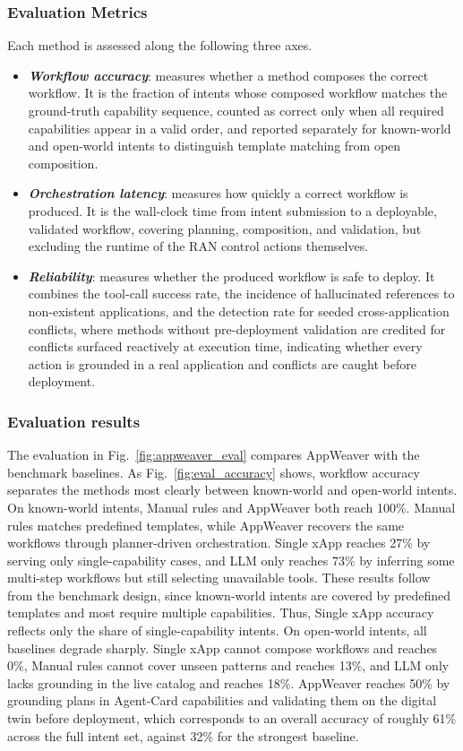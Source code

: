 \documentclass[conference]{IEEEtran}
\begin{document}
\subsubsection{Evaluation Metrics}
Each method is assessed along the following three axes.
\begin{itemize}[leftmargin=1.2em, itemsep=2pt, topsep=2pt]
  \item \textbf{\textit{Workflow accuracy}}: measures whether a method composes the correct workflow. It is the fraction of intents whose composed workflow matches the ground-truth capability sequence, counted as correct only when all required capabilities appear in a valid order, and reported separately for known-world and open-world intents to distinguish template matching from open composition.
  \item \textbf{\textit{Orchestration latency}}: measures how quickly a correct workflow is produced. It is the wall-clock time from intent submission to a deployable, validated workflow, covering planning, composition, and validation, but excluding the runtime of the RAN control actions themselves.
  \item \textbf{\textit{Reliability}}: measures whether the produced workflow is safe to deploy. It combines the tool-call success rate, the incidence of hallucinated references to non-existent applications, and the detection rate for seeded cross-application conflicts, where methods without pre-deployment validation are credited for conflicts surfaced reactively at execution time, indicating whether every action is grounded in a real application and conflicts are caught before deployment.
\end{itemize}

\subsubsection{Evaluation results} 
The evaluation in Fig.~\ref{fig:appweaver_eval} compares AppWeaver with the benchmark baselines.
As Fig.~\ref{fig:eval_accuracy} shows, workflow accuracy separates the methods most clearly between known-world and open-world intents. On known-world intents, Manual rules and AppWeaver both reach 100\%. Manual rules matches predefined templates, while AppWeaver recovers the same workflows through planner-driven orchestration. Single xApp reaches 27\% by serving only single-capability cases, and LLM only reaches 73\% by inferring some multi-step workflows but still selecting unavailable tools. These results follow from the benchmark design, since known-world intents are covered by predefined templates and most require multiple capabilities. Thus, Single xApp accuracy reflects only the share of single-capability intents. On open-world intents, all baselines degrade sharply. Single xApp cannot compose workflows and reaches 0\%, Manual rules cannot cover unseen patterns and reaches 13\%, and LLM only lacks grounding in the live catalog and reaches 18\%. AppWeaver reaches 50\% by grounding plans in Agent-Card capabilities and validating them on the digital twin before deployment, which corresponds to an overall accuracy of roughly 61\% across the full intent set, against 32\% for the strongest baseline.
\end{document}
